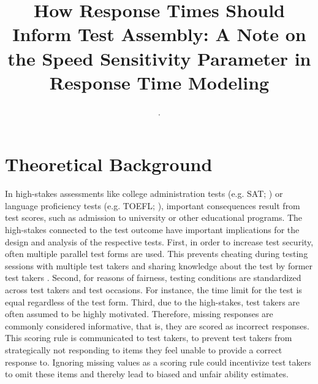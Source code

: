 \documentclass[a4paper,man,apacite,floatsintext,donotrepeattitle]{apa6}
\title{How Response Times Should Inform Test Assembly: A Note on the Speed Sensitivity Parameter in Response Time Modeling
\vspace{3cm}}
\author{\color{white}.}
\affiliation{\color{white}.}
\begin{document}
\maketitle

\clearpage
\setcounter{page}{2}
\section{Theoretical Background}
In high-stakes assessments like college administration tests (e.g. SAT; ) or language proficiency tests (e.g. TOEFL; ), important consequences result from test scores, such as admission to university or other educational programs. The high-stakes connected to the test outcome have important implications for the design and analysis of the respective tests. First, in order to increase test security, often multiple parallel test forms are used. This prevents cheating during testing sessions with multiple test takers and sharing knowledge about the test by former test takers \cite{Luecht.2011}. Second, for reasons of fairness, testing conditions are standardized across test takers and test occasions. For instance, the time limit for the test is equal regardless of the test form. Third, due to the high-stakes, test takers are often assumed to be highly motivated. Therefore, missing responses are commonly considered informative, that is, they are scored as incorrect responses. This scoring rule is communicated to test takers, to prevent test takers from strategically not responding to items they feel unable to provide a correct response to. Ignoring missing values as a scoring rule could incentivize test takers to omit these items and thereby lead to biased and unfair ability estimates. 
\end{document}
